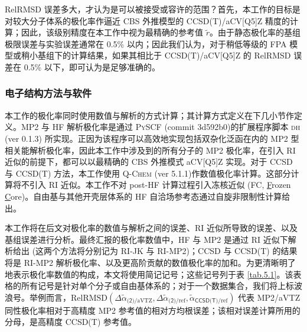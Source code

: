 RelRMSD 误差多大，才认为是可以被接受或容许的范围？首先，本工作的目标是对较大分子体系的极化率作逼近 CBS 外推模型的 CCSD(T)/aCV[Q5]Z 精度的计算；因此，该级别精度在本工作中视为最精确的参考值 $\tilde r$。由于静态极化率的基组极限误差与实验误差通常在 0.5\% 以内\cite{Brakestad-Frediani.JCTC.2020, Rumble-Rumble.CRC.2021}；因此我们认为，对于稍低等级的 FPA 模型或稍小基组下的计算结果，如果其相比于 CCSD(T)/aCV[Q5]Z 的 RelRMSD 误差在 0.5\% 以下，即可认为是足够准确的。


\subsubsection{电子结构方法与软件}

本工作的极化率同时使用数值与解析的方式计算；其计算方式定义在\alert{下几小节}作定义。MP2 与 HF 解析极化率是通过 \textsc{PySCF} (commit 3d592b0)\cite{Sun-Chan.WCMS.2018, Sun-Chan.JCP.2020}的扩展程序脚本 \textsc{dh} (ver 0.1.3)\cite{dh-0.1.ajz34} 所实现。正因为该程序可以高效地实现包括双杂化泛函在内的 MP2 型相关能解析极化率，因此本工作中涉及到的所有分子的 MP2 极化率，在引入 RI 近似的前提下，都可以以最精确的 CBS 外推模式 aCV[Q5]Z 实现。对于 CCSD 与 CCSD(T) 方法，本工作使用 \textsc{Q-Chem} (ver 5.1.1)\cite{Shao-Head-Gordon.MP.2015, Kaliman-Krylov.JCC.2017}作数值极化率计算。这部分计算将不引入 RI 近似。本工作不对 post-HF 计算过程引入冻核近似 (FC, \underline{F}rozen \underline{C}ore)。自由基与其他开壳层体系的 HF 自洽场参考态通过自旋非限制性计算给出。

本工作将在\alert{后文}对极化率的数值与解析之间的误差、RI 近似所导致的误差、以及基组误差进行分析。最终汇报的极化率数值中，HF 与 MP2 是通过 RI 近似下解析给出 (这两个方法将分别记为 RI-JK 与 RI-MP2)；CCSD 与 CCSD(T) 的结果将是 RI-MP2 解析极化率、以及更高阶贡献的数值极化率的加和。为更清晰明了地表示极化率数值的构成，本文将使用简记记号；这些记号列于表 \ref{tab.5.1}。该表格的所有记号是针对单个分子或自由基体系的；对于一个数据集合，我们将上标波浪号。举例而言，$\text{RelRMSD} (\Delta \tilde \alpha_{\textsf{(2)}/\text{aVTZ}}, \Delta \tilde \alpha_{\textsf{(2)}/\text{ref}}, \tilde \alpha_{\textsf{CCSD(T)}/\text{ref}})$ 代表 MP2/aVTZ 同性极化率相对于高精度 MP2 参考值的相对方均根误差；该相对误差计算所用的分母，是高精度 CCSD(T) 参考值。

